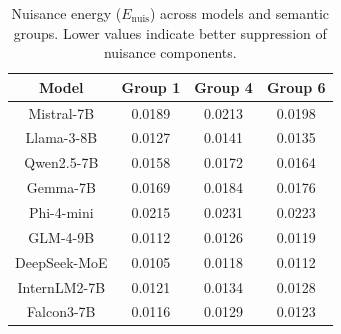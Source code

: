 \begin{table}[h]
\centering
\scriptsize
\setlength{\tabcolsep}{4pt}
\renewcommand{\arraystretch}{1.2}
\begin{tabular}{c|ccc}
\hline
Model 
& Group 1 
& Group 4 
& Group 6 \\
\hline

Mistral-7B 
& 0.0189 & 0.0213 & 0.0198 \\

Llama-3-8B 
& 0.0127 & 0.0141 & 0.0135 \\

Qwen2.5-7B
& 0.0158 & 0.0172 & 0.0164 \\

Gemma-7B
& 0.0169 & 0.0184 & 0.0176 \\

Phi-4-mini
& 0.0215 & 0.0231 & 0.0223 \\

GLM-4-9B
& 0.0112 & 0.0126 & 0.0119 \\

DeepSeek-MoE
& 0.0105 & 0.0118 & 0.0112 \\

InternLM2-7B
& 0.0121 & 0.0134 & 0.0128 \\

Falcon3-7B
& 0.0116 & 0.0129 & 0.0123 \\

\hline
\end{tabular}
\caption{Nuisance energy ($E_{\mathrm{nuis}}$) across models and semantic groups. Lower values indicate better suppression of nuisance components.}
\label{tab:energy}
\end{table}

